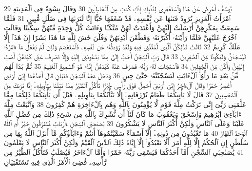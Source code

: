 {\tiny\colorbox{cl_aya}{29}} يُوسُفُ أَعْرِضْ عَنْ هَٰذَا وَٱسْتَغْفِرِى لِذَنۢبِكِ إِنَّكِ كُنتِ مِنَ ٱلْخَاطِـِٔينَ
{\tiny\colorbox{cl_aya}{30}} وَقَالَ نِسْوَةٌ فِى ٱلْمَدِينَةِ ٱمْرَأَتُ ٱلْعَزِيزِ تُرَٰوِدُ فَتَىٰهَا عَن نَّفْسِهِۦ قَدْ شَغَفَهَا حُبًّا إِنَّا لَنَرَىٰهَا فِى ضَلَٰلٍ مُّبِينٍ
{\tiny\colorbox{cl_aya}{31}} فَلَمَّا سَمِعَتْ بِمَكْرِهِنَّ أَرْسَلَتْ إِلَيْهِنَّ وَأَعْتَدَتْ لَهُنَّ مُتَّكَـًٔا وَءَاتَتْ كُلَّ وَٰحِدَةٍ مِّنْهُنَّ سِكِّينًا وَقَالَتِ ٱخْرُجْ عَلَيْهِنَّ فَلَمَّا رَأَيْنَهُۥٓ أَكْبَرْنَهُۥ وَقَطَّعْنَ أَيْدِيَهُنَّ وَقُلْنَ حَٰشَ لِلَّهِ مَا هَٰذَا بَشَرًا إِنْ هَٰذَآ إِلَّا مَلَكٌ كَرِيمٌ
{\tiny\colorbox{cl_aya}{32}} قَالَتْ فَذَٰلِكُنَّ ٱلَّذِى لُمْتُنَّنِى فِيهِ وَلَقَدْ رَٰوَدتُّهُۥ عَن نَّفْسِهِۦ فَٱسْتَعْصَمَ وَلَئِن لَّمْ يَفْعَلْ مَآ ءَامُرُهُۥ لَيُسْجَنَنَّ وَلَيَكُونًا مِّنَ ٱلصَّٰغِرِينَ
{\tiny\colorbox{cl_aya}{33}} قَالَ رَبِّ ٱلسِّجْنُ أَحَبُّ إِلَىَّ مِمَّا يَدْعُونَنِىٓ إِلَيْهِ وَإِلَّا تَصْرِفْ عَنِّى كَيْدَهُنَّ أَصْبُ إِلَيْهِنَّ وَأَكُن مِّنَ ٱلْجَٰهِلِينَ
{\tiny\colorbox{cl_aya}{34}} فَٱسْتَجَابَ لَهُۥ رَبُّهُۥ فَصَرَفَ عَنْهُ كَيْدَهُنَّ إِنَّهُۥ هُوَ ٱلسَّمِيعُ ٱلْعَلِيمُ
{\tiny\colorbox{cl_aya}{35}} ثُمَّ بَدَا لَهُم مِّنۢ بَعْدِ مَا رَأَوُا۟ ٱلْءَايَٰتِ لَيَسْجُنُنَّهُۥ حَتَّىٰ حِينٍ
{\tiny\colorbox{cl_aya}{36}} وَدَخَلَ مَعَهُ ٱلسِّجْنَ فَتَيَانِ قَالَ أَحَدُهُمَآ إِنِّىٓ أَرَىٰنِىٓ أَعْصِرُ خَمْرًا وَقَالَ ٱلْءَاخَرُ إِنِّىٓ أَرَىٰنِىٓ أَحْمِلُ فَوْقَ رَأْسِى خُبْزًا تَأْكُلُ ٱلطَّيْرُ مِنْهُ نَبِّئْنَا بِتَأْوِيلِهِۦٓ إِنَّا نَرَىٰكَ مِنَ ٱلْمُحْسِنِينَ
{\tiny\colorbox{cl_aya}{37}} قَالَ لَا يَأْتِيكُمَا طَعَامٌ تُرْزَقَانِهِۦٓ إِلَّا نَبَّأْتُكُمَا بِتَأْوِيلِهِۦ قَبْلَ أَن يَأْتِيَكُمَا ذَٰلِكُمَا مِمَّا عَلَّمَنِى رَبِّىٓ إِنِّى تَرَكْتُ مِلَّةَ قَوْمٍ لَّا يُؤْمِنُونَ بِٱللَّهِ وَهُم بِٱلْءَاخِرَةِ هُمْ كَٰفِرُونَ
{\tiny\colorbox{cl_aya}{38}} وَٱتَّبَعْتُ مِلَّةَ ءَابَآءِىٓ إِبْرَٰهِيمَ وَإِسْحَٰقَ وَيَعْقُوبَ مَا كَانَ لَنَآ أَن نُّشْرِكَ بِٱللَّهِ مِن شَىْءٍ ذَٰلِكَ مِن فَضْلِ ٱللَّهِ عَلَيْنَا وَعَلَى ٱلنَّاسِ وَلَٰكِنَّ أَكْثَرَ ٱلنَّاسِ لَا يَشْكُرُونَ
{\tiny\colorbox{cl_aya}{39}} يَٰصَىٰحِبَىِ ٱلسِّجْنِ ءَأَرْبَابٌ مُّتَفَرِّقُونَ خَيْرٌ أَمِ ٱللَّهُ ٱلْوَٰحِدُ ٱلْقَهَّارُ
{\tiny\colorbox{cl_aya}{40}} مَا تَعْبُدُونَ مِن دُونِهِۦٓ إِلَّآ أَسْمَآءً سَمَّيْتُمُوهَآ أَنتُمْ وَءَابَآؤُكُم مَّآ أَنزَلَ ٱللَّهُ بِهَا مِن سُلْطَٰنٍ إِنِ ٱلْحُكْمُ إِلَّا لِلَّهِ أَمَرَ أَلَّا تَعْبُدُوٓا۟ إِلَّآ إِيَّاهُ ذَٰلِكَ ٱلدِّينُ ٱلْقَيِّمُ وَلَٰكِنَّ أَكْثَرَ ٱلنَّاسِ لَا يَعْلَمُونَ
{\tiny\colorbox{cl_aya}{41}} يَٰصَىٰحِبَىِ ٱلسِّجْنِ أَمَّآ أَحَدُكُمَا فَيَسْقِى رَبَّهُۥ خَمْرًا وَأَمَّا ٱلْءَاخَرُ فَيُصْلَبُ فَتَأْكُلُ ٱلطَّيْرُ مِن رَّأْسِهِۦ قُضِىَ ٱلْأَمْرُ ٱلَّذِى فِيهِ تَسْتَفْتِيَانِ
